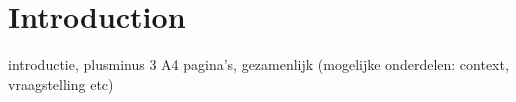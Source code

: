\section{Introduction}
introductie, plusminus 3 A4 pagina's, gezamenlijk (mogelijke onderdelen: context, vraagstelling etc)
